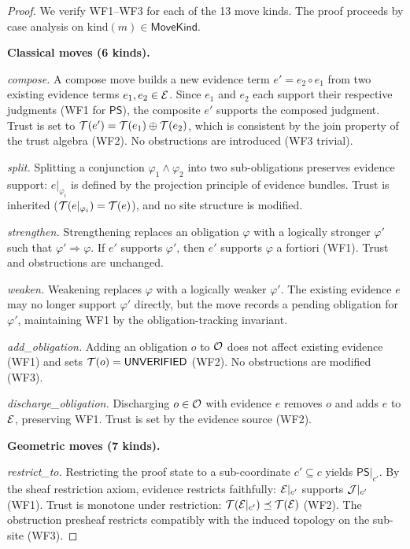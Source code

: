 \documentclass[11pt]{article}
\newcommand{\PS}{\mathsf{PS}}
\newcommand{\kind}{\mathrm{kind}}
\newcommand{\MoveKind}{\mathsf{MoveKind}}
\begin{document}
\begin{proof}
We verify WF1--WF3 for each of the 13 move kinds.  The proof
proceeds by case analysis on $\kind(m) \in \MoveKind$.

\medskip\noindent\textbf{Classical moves (6 kinds).}

\emph{compose.}
A compose move builds a new evidence term $e' = e_2 \circ e_1$
from two existing evidence terms $e_1, e_2 \in \mathcal{E}$.  Since
$e_1$ and $e_2$ each support their respective judgments (WF1 for
$\PS$), the composite $e'$ supports the composed judgment.  Trust
is set to $\mathcal{T}(e') = \mathcal{T}(e_1) \oplus \mathcal{T}(e_2)$, which is
consistent by the join property of the trust algebra (WF2).
No obstructions are introduced (WF3 trivial).

\emph{split.}
Splitting a conjunction $\varphi_1 \wedge \varphi_2$ into two
sub-obligations preserves evidence support: $e|_{\varphi_i}$
is defined by the projection principle of evidence bundles.
Trust is inherited ($\mathcal{T}(e|_{\varphi_i}) = \mathcal{T}(e)$), and
no site structure is modified.

\emph{strengthen.}
Strengthening replaces an obligation $\varphi$ with a
logically stronger $\varphi'$ such that $\varphi' \Rightarrow \varphi$.
If $e'$ supports $\varphi'$, then $e'$ supports $\varphi$ a fortiori (WF1).
Trust and obstructions are unchanged.

\emph{weaken.}
Weakening replaces $\varphi$ with a logically weaker $\varphi'$.
The existing evidence $e$ may no longer support $\varphi'$ directly,
but the move records a pending obligation for $\varphi'$, maintaining
WF1 by the obligation-tracking invariant.

\emph{add\_obligation.}
Adding an obligation $o$ to $\mathcal{O}$ does not affect existing
evidence (WF1) and sets $\mathcal{T}(o) = \mathsf{UNVERIFIED}$ (WF2).
No obstructions are modified (WF3).

\emph{discharge\_obligation.}
Discharging $o \in \mathcal{O}$ with evidence $e$ removes $o$ and
adds $e$ to $\mathcal{E}$, preserving WF1.  Trust is set by the
evidence source (WF2).

\medskip\noindent\textbf{Geometric moves (7 kinds).}

\emph{restrict\_to.}
Restricting the proof state to a sub-coordinate $c' \subseteq c$
yields $\PS|_{c'}$.  By the sheaf restriction axiom, evidence
restricts faithfully: $\mathcal{E}|_{c'}$ supports $\mathcal{J}|_{c'}$ (WF1).
Trust is monotone under restriction: $\mathcal{T}(\mathcal{E}|_{c'}) \preceq
\mathcal{T}(\mathcal{E})$ (WF2).  The obstruction presheaf restricts
compatibly with the induced topology on the sub-site (WF3).


\end{proof}
\end{document}
